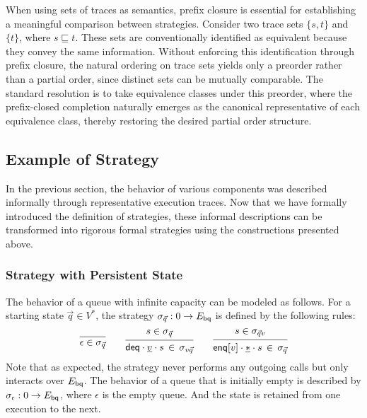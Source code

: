 When using sets of traces as semantics,
prefix closure is essential
for establishing a meaningful comparison between strategies.
Consider two trace sets $\{ s, t \}$ and $\{ t \}$,
where $s \sqsubseteq t$.
These sets are conventionally identified
as equivalent because they convey the same information.
Without enforcing this identification through prefix closure,
the natural ordering on trace sets yields
only a preorder rather than a partial order,
since distinct sets can be mutually comparable.
The standard resolution is to take equivalence classes
under this preorder,
where the prefix-closed completion naturally emerges
as the canonical representative of each equivalence class,
thereby restoring the desired partial order structure.

\subsection{Example of Strategy}

In the previous section,
the behavior of various components
was described informally
through representative execution traces.
Now that we have formally introduced
the definition of strategies,
these informal descriptions can be transformed
into rigorous formal strategies
using the constructions presented above.

\subsubsection{Strategy with Persistent State}
\label{sec:strat:ex:persistent}

The behavior of a queue with infinite capacity
can be modeled as follows.
For a starting state $\vec{q} \in V^*$,
the strategy $\sigma_{\vec{q}} : 0 \rightarrow E_{ \mathsf{bq} }$
is defined by the following rules:
\[
  \begin{prooftree}
    \infer0{\epsilon \in \sigma_{\vec{q}} }
  \end{prooftree}
  \qquad
  \begin{prooftree}
    \hypo{s \in \sigma_{\vec{q}} }
    \infer1{\kw{deq} \cdot \underline{v} \cdot s \, \in \, \sigma_{v \vec{q}} }
  \end{prooftree}
  \qquad
  \begin{prooftree}
    \hypo{s \in \sigma_{\vec{q} v}}
    \infer1{\kw{enq}[v] \cdot \underline{*} \cdot s \, \in \, \sigma_{\vec{q}} }
  \end{prooftree}
\]
Note that as expected, the strategy never performs any outgoing calls
but only interacts over $E_{ \mathsf{bq} }$.
The behavior of a queue that is initially empty
is described by $\sigma_\epsilon : 0 \rightarrow E_{ \mathsf{bq} }$,
where $\epsilon$ is the empty queue.
And the state is retained from one execution to the next.


